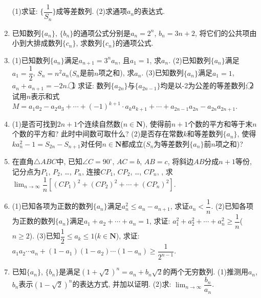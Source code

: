 \documentclass[10pt,a4paper]{article}
\begin{document}
\begin{enumerate}[1.]
(1)求证: $\{\dfrac 1{S_n}\}$成等差数列.
(2)求通项$a_n$的表达式.
\item 已知数列$\{a_n\}$, $\{b_n\}$的通项公式分别是$a_n=2^n$, $b_n=3n+2$, 将它们的公共项由小到大排成数列$\{c_n\}$, 求数列$\{c_n\}$的通项公式.
\item (1)已知数列$\{a_n\}$满足$a_{n+1}=3^na_n$, 且$a_1=1$, 求$a_n$.
(2)已知数列$\{a_n\}$满足$a_1=\dfrac 12$, $S_n=n^2a_n$($S_n$是前$n$项之和), 求$a_n$.
(3)已知数列$\{a_n\}$满足$a_1=1$, $a_n+a_{n+1}=-2n$.
\textcircled{1} 求证: 数列$\{a_{2n}\}$与$\{a_{2n-1}\}$均是以-2为公差的等差数列;
\textcircled{2} 试用$n$表示和式$M=a_1a_2-a_2a_3+\cdots +(-1)^{k+1}\cdot a_ka_{k+1}+\cdots +a_{2n-1}a_{2n}-a_{2n}a_{2n+1}$.
\item (1)是否可找到$2n+1$个连续自然数($n\in \mathbf{N}$), 使得前$n+1$个数的平方和等于末$n$个数的平方和? 此时中间数可取什么?
(2)是否存在常数$k$和等差数列$\{a_n\}$, 使得$ka_n^2-1=S_{2n}-S_{n+1}$对任何$n\in \mathbf{N}$都成立($S_n$为等差数列$\{a_n\}$前$n$项之和)?
\item 在直角$\triangle ABC$中, 已知$\angle C=90^\circ$, $AC=b$, $AB=c$, 将斜边$AB$分成$n+1$等份, 记分点为$P_1$, $P_2$, …, $P_n$, 连接$CP_1$, $CP_2$, …, $CP_n$, , 求$\displaystyle \lim_{n\to \infty} \dfrac 1n[(CP_1)^2+(CP_2)^2+\cdots +(CP_n)^2]$.
\item (1)已知各项为正数的数列$\{a_n\}$满足$a_n^2\le a_n-a_{n+1}$, 求证$a_n<\dfrac 1n$.
(2)已知各项为正数的数列$\{a_n\}$满足$a_1+a_2+\cdots +a_n=1$, 求证: $a_1^2+a_2^2+\cdots +a_n^2\ge \dfrac 1n$($n\ge 2$).
(3)已知$\dfrac 12\le a_k\le 1$($k\in \mathbf{N}$), 求证: $a_1a_2\cdots a_n+(1-a_1)(1-a_2)\cdots (1-a_n)\ge \dfrac 1{2^{n-1}}$.
\item 已知$\{a_n\}$, $\{b_n\}$是满足$(1+\sqrt 2)^n=a_n+b_n\sqrt 2$的两个无穷数列.
(1)推测用$a_n$, $b_n$表示$(1-\sqrt 2)^n$的表达方式, 并加以证明.
(2)求: $\displaystyle \lim_{n\to \infty} \dfrac{b_n}{a_n}$.


\end{enumerate}
\end{document}
